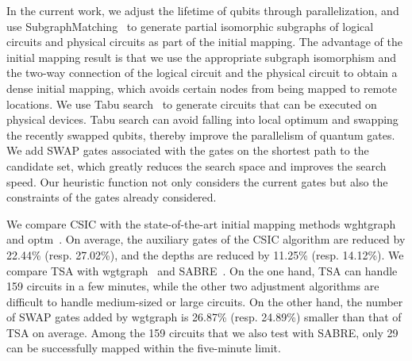 \documentclass[journal]{IEEEtran}
\begin{document}
In the current work, we adjust the lifetime of qubits through parallelization, and use SubgraphMatching~\cite{Sun2020} to generate partial isomorphic subgraphs of logical circuits %
and physical circuits %
as part of the initial mapping. The advantage of the initial mapping result is that we use the appropriate subgraph isomorphism and the two-way connection of the logical circuit and the physical circuit to obtain a dense initial mapping, which avoids certain nodes from being mapped to remote locations. We use Tabu search~\cite{Glover1990} to generate circuits that can be executed on physical devices. Tabu search can avoid falling into local optimum and swapping the recently swapped qubits, thereby improve the parallelism of quantum gates. We add SWAP gates associated with the gates on the shortest path to the candidate set, which greatly reduces the search space and improves the search speed. Our heuristic function not only considers the current gates but also the constraints of the gates already considered.

We compare CSIC with the state-of-the-art initial mapping methods wghtgraph~\cite{2020Qubit} and optm~\cite{Zulehner2017}. On average, the auxiliary gates of the CSIC algorithm are reduced by 22.44\% (resp. 27.02\%), and the depths are reduced by 11.25\% (resp. 14.12\%). We compare TSA with wgtgraph~\cite{2020Qubit} and SABRE~\cite{Li2018}. On the one hand, TSA can handle 159 circuits in a few minutes, while the  other two adjustment algorithms are difficult to handle medium-sized or large circuits. On the other hand, the number of SWAP gates added by wgtgraph is 26.87\% (resp. 24.89\%) smaller than that of  TSA on average. Among the 159 circuits that we also test with SABRE, only 29  can be successfully mapped within the five-minute limit.
\end{document}
